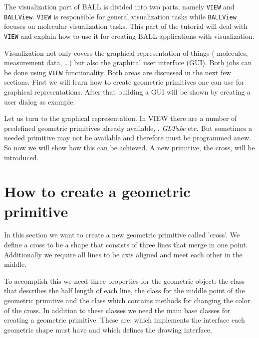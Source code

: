 The visualization part of BALL is divided into two parts, namely {\tt VIEW}
and {\tt BALLView}. {\tt VIEW} is responsible for general visualization tasks
while {\tt BALLView} focuses on molecular visualization tasks. This part of the
tutorial will deal with {\tt VIEW} and explain how to use it for creating BALL
applications with visualization.

Visualization not only covers the graphical representation of things (\eg
molecules, measurement data, \dots) but also the graphical user interface
(GUI). Both jobs can be done using {\tt VIEW} functionality. Both areas are
discussed in the next few sections. First we will learn how to create
geometric primitives one can use for graphical representations. After that
building a GUI will be shown by creating a user dialog as example.

Let us turn to the graphical representation. In VIEW there are a number of
predefined geometric primitives already available, , {\em
GLTube} etc. But sometimes a needed primitive may not be available and
therefore must be programmed anew. So now we will show how this can be
achieved. A new primitive, the cross, will be introduced.

\section{How to create a geometric primitive}
\label{section:view_create_a_geometric_primitive}

In this section we want to create a new geometric primitive called 'cross'.
We define a cross to be a shape that consists of three lines that merge in one
point. Additionally we require all lines to be axis aligned and meet each
other in the middle.

To accomplish this we need three properties for the geometric object: the
class  that describes the half length of each line, the class 
 for the middle point of the geometric primitive and the class 
 which contains methods for changing the color of the
cross. In addition to these classes we need the main base classes for
creating a geometric primitive. These are:  which
implements the interface each geometric shape must have and 
which defines the drawing interface.

